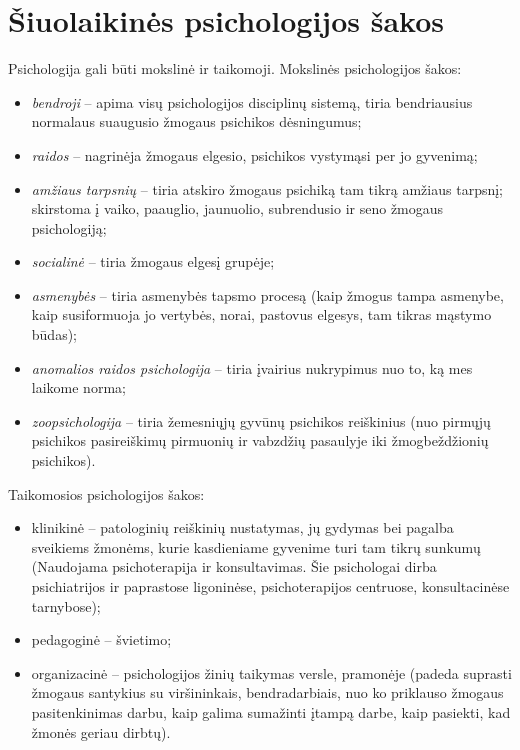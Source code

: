 \section{Šiuolaikinės psichologijos šakos}

\label{tema:psichologijos_sakos}

Psichologija gali būti mokslinė ir taikomoji. Mokslinės psichologijos
šakos:
\begin{itemize}
  \item \emph{bendroji} – apima visų psichologijos disciplinų sistemą,
    tiria bendriausius normalaus suaugusio žmogaus psichikos dėsningumus;
  \item \emph{raidos} – nagrinėja žmogaus elgesio, psichikos vystymąsi per 
    jo gyvenimą;
  \item \emph{amžiaus tarpsnių} – tiria atskiro žmogaus psichiką tam tikrą
    amžiaus tarpsnį; skirstoma į vaiko, paauglio, jaunuolio, subrendusio
    ir seno žmogaus psichologiją;
  \item \emph{socialinė} – tiria žmogaus elgesį grupėje;
  \item \emph{asmenybės} – tiria asmenybės tapsmo procesą (kaip žmogus tampa
    asmenybe, kaip susiformuoja jo vertybės, norai, pastovus elgesys,
    tam tikras mąstymo būdas);
  \item \emph{anomalios raidos psichologija} – tiria įvairius nukrypimus 
    nuo to, ką mes laikome norma;
  \item \emph{zoopsichologija} – tiria žemesniųjų gyvūnų psichikos 
    reiškinius (nuo pirmųjų psichikos pasireiškimų pirmuonių ir vabzdžių
    pasaulyje iki žmogbeždžionių psichikos).
\end{itemize}
Taikomosios psichologijos šakos:
\begin{itemize}
  \item klinikinė – patologinių reiškinių nustatymas, jų gydymas bei
    pagalba sveikiems žmonėms, kurie kasdieniame gyvenime turi tam tikrų
    sunkumų (Naudojama psichoterapija ir konsultavimas. Šie psichologai
    dirba psichiatrijos ir paprastose ligoninėse, psichoterapijos 
    centruose, konsultacinėse tarnybose);
  \item pedagoginė – švietimo;
  \item organizacinė – psichologijos žinių taikymas versle, pramonėje
    (padeda suprasti žmogaus santykius su viršininkais, bendradarbiais,
    nuo ko priklauso žmogaus pasitenkinimas darbu, kaip galima sumažinti
    įtampą darbe, kaip pasiekti, kad žmonės geriau dirbtų).
\end{itemize}

